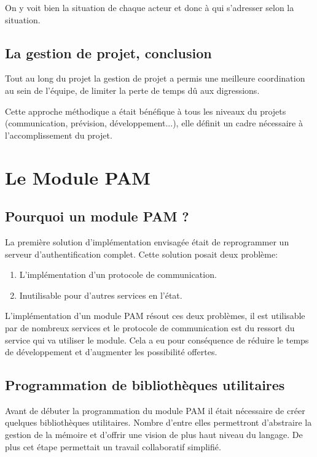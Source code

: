 On y voit bien la situation de chaque acteur et donc à qui s'adresser selon la situation.


\subsection{La gestion de projet, conclusion}

Tout au long du projet la gestion de projet a permis une meilleure coordination au sein de l'équipe, de limiter la perte de temps dû aux digressions.

Cette approche méthodique a était bénéfique à tous les niveaux du projets 
(communication, prévision, développement...), elle définit un cadre nécessaire à 
l'accomplissement du projet.%

\section{Le Module PAM}
\subsection{Pourquoi un module PAM ?}
La première solution d'implémentation envisagée était de reprogrammer un
serveur d'authentification complet. Cette solution posait deux problème:
\begin{enumerate}
  \item L'implémentation d'un protocole de communication.
  \item Inutilisable pour d'autres services en l'état.
\end{enumerate}

L'implémentation d'un module PAM résout ces deux problèmes, il est utilisable
par de nombreux services et le protocole de communication est du ressort du
service qui va utiliser le module. Cela a eu pour conséquence de réduire le
temps de développement et d'augmenter les possibilité offertes.

\subsection{Programmation de bibliothèques utilitaires}
Avant de débuter la programmation du module PAM il était nécessaire de créer
quelques bibliothèques utilitaires. Nombre d'entre elles permettront
d'abstraire la gestion de la mémoire et d'offrir une vision de plus haut niveau
du langage. De plus cet étape permettait un travail collaboratif simplifié.

